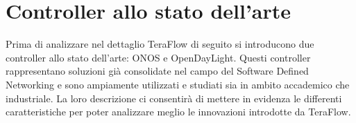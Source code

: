 


\section{Controller allo stato dell'arte}
Prima di analizzare nel dettaglio TeraFlow di seguito si introducono due controller allo stato dell'arte: ONOS e OpenDayLight.
Questi controller rappresentano soluzioni già consolidate nel campo del Software Defined Networking e sono ampiamente utilizzati e studiati sia in ambito accademico che industriale.
La loro descrizione ci consentirà di mettere in evidenza le differenti caratteristiche per poter analizzare meglio le innovazioni introdotte da TeraFlow.

